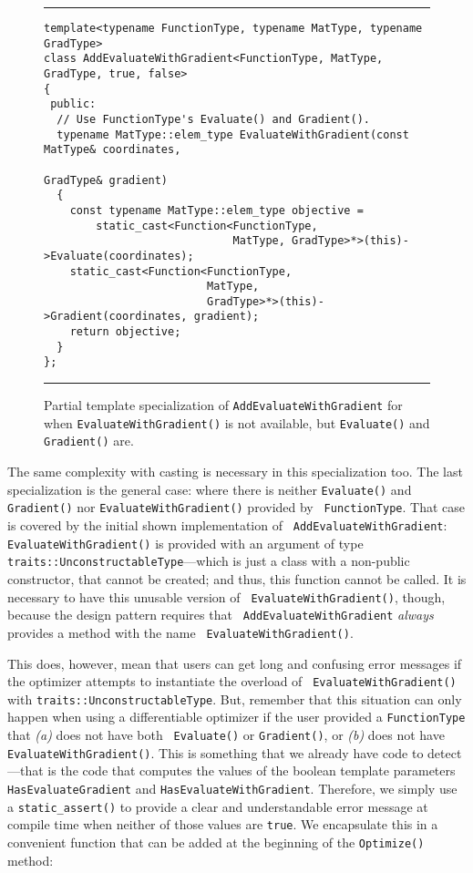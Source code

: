 \begin{figure}[b!]
\hrule
\vspace{1ex}
\begin{verbatim}
template<typename FunctionType, typename MatType, typename GradType>
class AddEvaluateWithGradient<FunctionType, MatType, GradType, true, false>
{
 public:
  // Use FunctionType's Evaluate() and Gradient().
  typename MatType::elem_type EvaluateWithGradient(const MatType& coordinates,
                                                   GradType& gradient)
  {
    const typename MatType::elem_type objective =
        static_cast<Function<FunctionType,
                             MatType, GradType>*>(this)->Evaluate(coordinates);
    static_cast<Function<FunctionType,
                         MatType,
                         GradType>*>(this)->Gradient(coordinates, gradient);
    return objective;
  }
};
\end{verbatim}
\hrule
\vspace*{-0.5em}
\caption{Partial template specialization of {\tt AddEvaluateWithGradient} for
when {\tt EvaluateWithGradient()} is not available, but {\tt Evaluate()} and
{\tt Gradient()} are.}
\label{fig:aewg-s2}
\end{figure}

The same complexity with casting is necessary in this specialization too.  The
last specialization is the general case: where there is neither {\tt Evaluate()}
and {\tt Gradient()} nor {\tt EvaluateWithGradient()} provided by {\tt
FunctionType}.  That case is covered by the initial shown implementation of {\tt
AddEvaluateWithGradient}: {\tt EvaluateWithGradient()} is provided with an
argument of type {\tt traits::UnconstructableType}---which is just a class with
a non-public constructor, that cannot be created; and thus, this function cannot
be called.  It is necessary to have this unusable version of {\tt
EvaluateWithGradient()}, though, because the design pattern requires that {\tt
AddEvaluateWithGradient} {\em always} provides a method with the name {\tt
EvaluateWithGradient()}.

This does, however, mean that users can get long and confusing error messages if
the optimizer attempts to instantiate the overload of {\tt
EvaluateWithGradient()} with {\tt traits::UnconstructableType}.  But, remember
that this situation can only happen when using a differentiable optimizer if
the user provided a {\tt FunctionType} that {\it (a)} does not have both {\tt
Evaluate()} or {\tt Gradient()}, or {\it (b)} does not have {\tt
EvaluateWithGradient()}.  This is something that we already have code to
detect---that is the code that computes the values of the boolean template
parameters {\tt HasEvaluateGradient} and {\tt HasEvaluateWithGradient}.
Therefore, we simply use a {\tt static\_assert()} to provide a clear and
understandable error message at compile time when neither of those values are
{\tt true}.  We encapsulate this in a convenient function that can be added at
the beginning of the {\tt Optimize()} method:

